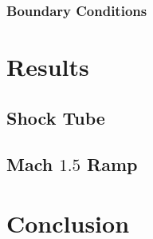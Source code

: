 \documentclass[paper=a4, fontsize=11pt]{scrartcl}
\numberwithin{equation}{section}        %
\numberwithin{figure}{section}          %
\numberwithin{table}{section}               %
\begin{document}
\subsubsection{Boundary Conditions}


\section{Results}
\subsection{Shock Tube}

\subsection{Mach $1.5$ Ramp}

\section{Conclusion}
\end{document}
